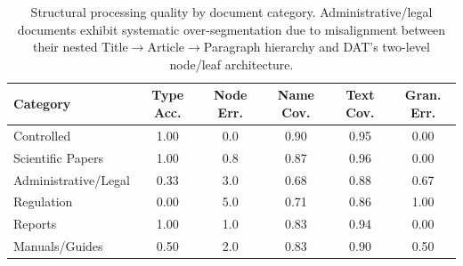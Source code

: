 \begin{table}[t]
\centering
\caption{Structural processing quality by document category. Administrative/legal documents exhibit systematic over-segmentation due to misalignment between their nested Title$\to$Article$\to$Paragraph hierarchy and DAT's two-level node/leaf architecture.}
\label{tab:structure}
\begin{tabular}{lccccc}
\toprule
\textbf{Category} & \textbf{Type Acc.} & \textbf{Node Err.} & \textbf{Name Cov.} & \textbf{Text Cov.} & \textbf{Gran. Err.} \\
\midrule
Controlled & 1.00 & 0.0 & 0.90 & 0.95 & 0.00 \\
Scientific Papers & 1.00 & 0.8 & 0.87 & 0.96 & 0.00 \\
Administrative/Legal & 0.33 & 3.0 & 0.68 & 0.88 & 0.67 \\
Regulation & 0.00 & 5.0 & 0.71 & 0.86 & 1.00 \\
Reports & 1.00 & 1.0 & 0.83 & 0.94 & 0.00 \\
Manuals/Guides & 0.50 & 2.0 & 0.83 & 0.90 & 0.50 \\
\bottomrule
\end{tabular}
\end{table}
